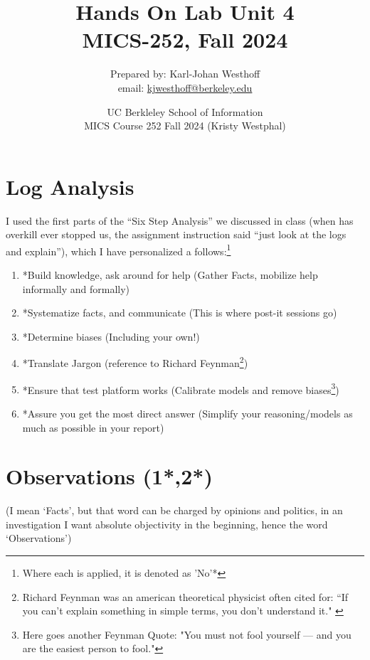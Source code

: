\documentclass[
	letterpaper, %
	10pt, %
	unnumberedsections, %
	twoside, %
]{APAAssignment}
\title{Hands On Lab Unit 4 \\ MICS-252, Fall 2024} %
\date{UC Berkleley School of Information \\
MICS Course 252 Fall 2024 (Kristy Westphal)
}
\author{
	Prepared by: Karl-Johan Westhoff \\
	email: \href{mailto:kjwesthoff@berkeley.edu}{kjwesthoff@berkeley.edu}
}
\begin{document}
\onecolumn
\maketitle %



\section{Log Analysis}\label{log-analysis}

I used the first parts of the ``Six Step Analysis'' we discussed in class (when has overkill ever stopped us, the assignment instruction
said ``just look at the logs and explain''), which I have personalized a follows:\footnote{Where each is applied, it is denoted as 'No'*}

\begin{enumerate}
  \item *Build knowledge, ask around for help (Gather Facts, mobilize help informally and formally) 
  \item *Systematize facts, and communicate (This is where post-it sessions go) 
  \item *Determine biases (Including your own!) 
  \item *Translate Jargon (reference to Richard Feynman\footnote{Richard Feynman was an american theoretical physicist often cited for: “If you can't explain something in simple terms, you don't understand it."\cite{FeynmanMedium} \cite{FeynmanWikipedia}})
  \item *Ensure that test platform works (Calibrate models and remove biases\footnote{Here goes another Feynman Quote: "You must not fool yourself — and you are the easiest person to fool."\cite{FeynmanFoolOurselves}})
  \item *Assure you get the most direct answer (Simplify your reasoning/models as much as possible in your report)
\end{enumerate}


\section{Observations (1*,2*)}\label{observations}

(I mean `Facts', but that word can be charged by opinions and politics,
in an investigation I want absolute objectivity in the beginning, hence the word
`Observations') \\
\end{document}
